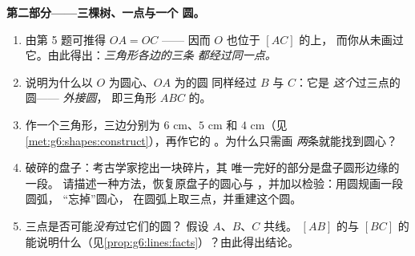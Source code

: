 \begin{problem}
\medskip
\noindent\textbf{第二部分——三棵树、一点与一个
圆。}
\begin{enumerate}[resume]
  \item 由第 5 题可推得 $OA = OC$ —— 因而
        $O$ 也位于 $[AC]$ 的上，
        而你从未画过它。由此得出：\emph{三角形各边的三条
        都经过同一点。}
  \item 说明为什么以 $O$ 为圆心、$OA$ 为的圆
        同样经过 $B$ 与 $C$：它是
        \emph{这个}过三点的圆——
        \emph{外接圆}，
        即三角形 $ABC$ 的。
  \item 作一个三角形，三边分别为 $6$ cm、$5$ cm 和
        $4$ cm（见\cref{met:g6:shapes:construct}），再作它的
        。为什么只需画
        \emph{两}条就能找到圆心？
  \item 破碎的盘子：考古学家挖出一块碎片，其
        唯一完好的部分是盘子圆形边缘的一段。
        请描述一种方法，恢复原盘子的圆心与
        ，并加以检验：用圆规画一段圆弧，
        “忘掉”圆心，
        在圆弧上取三点，并重建这个圆。
  \item 三点是否可能\emph{没有}过它们的圆？
        假设 $A$、$B$、$C$ 共线。
        $[AB]$ 的与
        $[BC]$ 的能说明什么（见\cref{prop:g6:lines:facts}）？由此得出结论。
\end{enumerate}


\end{problem}
